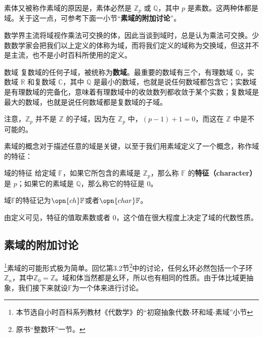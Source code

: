素体又被称作素域的原因是，素体必然是 $\mathbb{Z}_p$ 或 $\mathbb{Q}$，其中 $p$ 是素数。这两种体都是域。关于这一点，可参考下面一小节“\textbf{素域的附加讨论}”。




数学界主流将域视作乘法可交换的体，因此当谈到域时，总是认为乘法可交换。少数数学家会把我们以上定义的体称为域，而将我们定义的域称为交换域，但这并不是主流，也不是小时百科所使用的定义。

\begin{example}{数域}
复数域的任何子域，被统称为\textbf{数域}。最重要的数域有三个，有理数域 $\mathbb{Q}$，实数域 $\mathbb{R}$ 和复数域 $\mathbb{C}$，其中 $\mathbb{Q}$ 是最小的数域，也就是说任何数域都包含它；实数域是有理数域的完备化，意味着有理数域中的收敛数列都收敛于某个实数；复数域是最大的数域，也就是说任何数域都是复数域的子域。

注意，$\mathbb{Z}_p$ 并不是 $\mathbb{Z}$ 的子域，因为在 $\mathbb{Z}_p$ 中，$(p-1)+1=0$，而这在 $\mathbb{Z}$ 中是不可能的。
\end{example}

素域的概念对于描述任意的域是关键，以至于我们用素域定义了一个概念，称作域的特征：

\begin{definition}{域的特征}\label{def_field_2}
给定域 $\mathbb{F}$，如果它所包含的素域是 $\mathbb{Z}_p$，那么称 $\mathbb{F}$ 的\textbf{特征（character）}是 $p$；如果它的素域是 $\mathbb{Q}$，那么称它的特征是 $0$。

域$\mathbb{F}$的特征记为$\opn{ch}\mathbb{F}$或者$\opn{char}\mathbb{F}$。
\end{definition}

由定义可见，特征的值取素数或者 $0$，这个值在很大程度上决定了域的代数性质。


\subsection{素域的附加讨论}

\footnote{本节选自小时百科系列教材《代数学》的“初窥抽象代数-环和域-素域”小节}素域的可能形式极为简单。回忆第3.2节\footnote{原书“整数环”一节。}中的讨论，任何幺环必然包括一个子环$\mathbb{Z}_n$，其中$\mathbb{Z}_0=\mathbb{Z}$。域和体当然都是幺环，所以也有相同的性质。由于体比域更抽象，我们接下来就设$\mathbb{F}$为一个体来进行讨论。

